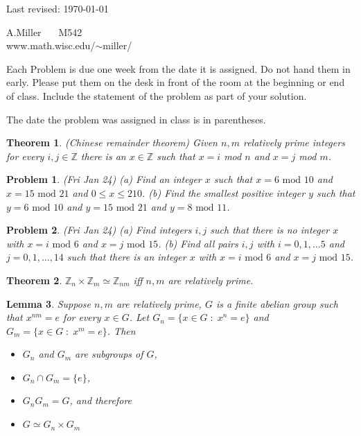 \documentclass[12pt]{article}
\def\zz{{\mathbb Z}}
\def\isom{\simeq}
\def\st{\;:\;}
\newtheorem{theorem}{Theorem}
\newtheorem{lemma}[theorem]{Lemma}
\newtheorem{prob}{Problem}
\begin{document}
\noindent  Last revised: \today

\begin{flushright}
  A.Miller $\;\;\;\;$  M542 \\
  www.math.wisc.edu/$\sim$miller/\\
\end{flushright}


\bigskip
Each Problem is due one week from the date it is assigned.
Do not hand them in early.
Please put them on the desk in front of the room at the
beginning or end of class. Include the statement of the problem
as part of your solution.

The date the problem was assigned in class is in parentheses.

\bigskip

\begin{theorem}
(Chinese remainder theorem) Given $n,m$ relatively prime integers for
every $i,j\in\zz$ there is an $x\in\zz$ such that
$x=i$ mod  $n$ and $x=j$ mod  $m$.
\end{theorem}

\def\mod{\mbox{ mod }}

\begin{prob} (Fri Jan 24) (a) Find an integer $x$ such that
$x= 6 \mod 10$ and $x=15 \mod 21$ and $0\leq x\leq 210$.
(b) Find the smallest positive integer $y$ such that 
$y= 6 \mod 10$ and $y=15 \mod 21$ and $y= 8 \mod 11$.
\end{prob}

\begin{prob}(Fri Jan 24)
(a) Find integers $i,j$ such that there is no integer $x$ with
$x= i \mod 6$ and $x= j \mod 15$.   (b) Find all pairs $i,j$
with $i=0,1,\dots 5$ and $j=0,1,\ldots, 14$ such that there
is an integer $x$ with $x= i \mod 6$ and $x= j \mod 15$.
\end{prob}


\begin{theorem}
$\zz_n\times\zz_m\isom \zz_{nm}$ iff $n,m$ are relatively prime.
\end{theorem}

\begin{lemma}
Suppose $n,m$ are relatively prime, $G$ is a finite abelian group such that
$x^{nm}=e$ for every $x\in G$.  Let $G_n=\{x\in G\st x^n=e\}$ and
$G_m=\{x\in G\st x^m=e\}$.  Then
\begin{itemize}
\item $G_n$ and $G_m$ are subgroups of $G$,
\item $G_n\cap G_m=\{e\}$,
\item $G_nG_m=G$, and therefore
\item $G\isom G_n\times G_m$
\end{itemize}
\end{lemma}
\end{document}
